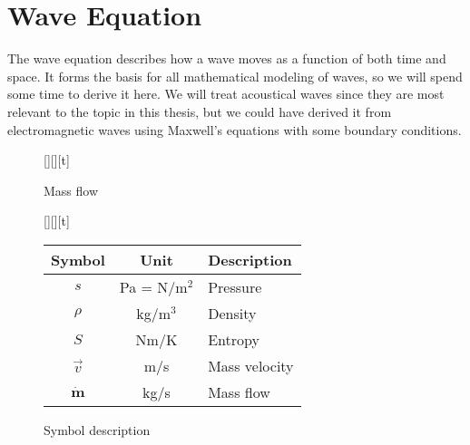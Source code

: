 
\newpage

\section{Wave Equation}

The wave equation describes how a wave moves as a function of both time and space. It forms the basis for all mathematical modeling of waves, so we will spend some time to derive it here. We will treat acoustical waves since they are most relevant to the topic in this thesis, but we could have derived it from electromagnetic waves using Maxwell's equations with some boundary conditions.

\begin{figure}[ht]
\begin{floatrow}

[\linewidth][\FBheight][t]{%
\caption{Mass flow}}{%
}%

[\linewidth][\FBheight][t]{%
\caption{Symbol description}}{%
\begin{tabular}[c]{c c l}\hline
\rowcolor{tabBlue}\bf Symbol & \bf Unit & \bf Description \\\hline
$s$ & Pa = N/m$^2$ & Pressure \\
$\rho$ & kg/m$^3$ & Density \\
$S$ & Nm/K & Entropy \\
$\vec v$ & m/s & Mass velocity \\
$\dot{\boldsymbol{m}}$ & kg/s & Mass flow
\end{tabular}}

\end{floatrow}
\end{figure}


